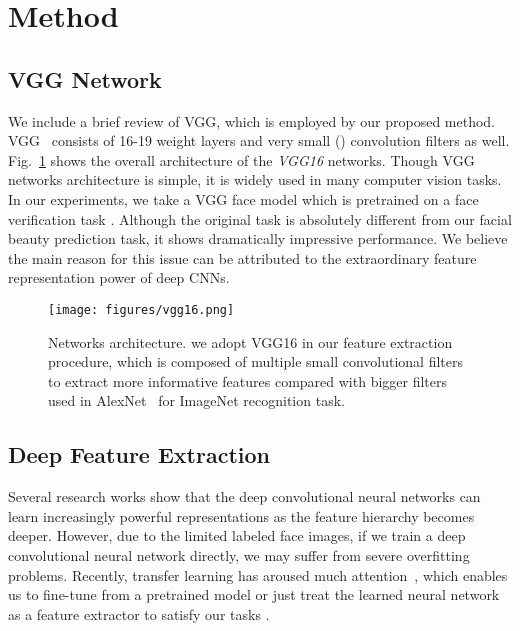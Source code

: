 \documentclass[a4paper,conference]{IEEEtran}
\begin{document}
\section{Method}

 \subsection{VGG Network}
    We include a brief review of VGG, which is employed by our proposed method.
    VGG~\cite{simonyan2014very} consists of 16-19 weight layers and very small
    () convolution filters as well.
    Fig.~\ref{vgg16} shows the overall architecture of the \emph{VGG16} networks.
    Though VGG networks architecture is simple, it is widely used in many
    computer vision tasks. In our experiments, we take a VGG face model which is
    pretrained on a face verification task \cite{parkhi2015deep}.
    Although the original task is absolutely different from our facial beauty
    prediction task, it shows dramatically impressive performance.
    We believe the main reason for this issue can be attributed to the
    extraordinary feature representation power of deep CNNs.


    \begin{figure}[!htb]
      \centering
      \texttt{[image: figures/vgg16.png]}
      \caption{Networks architecture. we adopt VGG16 in our feature extraction
      procedure, which is composed of multiple small convolutional filters to
      extract more informative features compared with bigger filters used in
      AlexNet~\cite{krizhevsky2012imagenet} for ImageNet recognition task.}
      \label{vgg16}
    \end{figure}


  \subsection{Deep Feature Extraction}
    Several research works \cite{bengio2012deep,lecun2015deep} show
    that the deep convolutional neural networks can learn increasingly powerful
    representations as the feature hierarchy becomes deeper. However,
    due to the limited labeled face images, if we train a deep convolutional
    neural network directly, we may suffer from severe overfitting problems.
    Recently, transfer learning has aroused much attention~\cite{Yuan18}, which
    enables us to fine-tune from a pretrained model or just treat the learned
    neural network as a feature extractor to satisfy our tasks
    \cite{yosinski2014transferable}.
\end{document}
